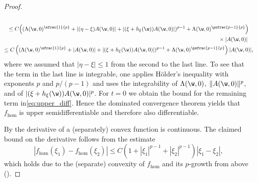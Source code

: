 \begin{proof}
\begin{multline*}
\\
\leq C \Bigl((\Lambda(\w,0)^{\sfrac{1}{p}}+|(\eta-\xi)A(\w,0)|+|(\xi+h_{\xi}(\w))A(\w,0)|)^{p-1}+\Lambda(\w,0)^{\psfrac{p-1}{p}}\Bigr)\\
\shoveright{{}\times|A(\w,0)|}
\\
\leq C \left((\Lambda(\w,0)^{\sfrac{1}{p}}+|A(\w,0)|+|(\xi+h_{\xi}(\w))A(\w,0)|)^{p-1}+\Lambda(\w,0)^{\psfrac{p-1}{p}}\right)|A(\w,0)|,
\end{multline*}
where we assumed that $|\eta-\xi|\leq 1$ from the second to the last line.
To see that the term in the last line is integrable, one applies Hölder's inequality with exponents $p$ and $p/(p-1)$ and uses the integrability of $\Lambda(\w,0)$, $\|A(\w,0)\|^p$, and of $|(\xi+h_{\xi}(\w))A(\w,0)|^p$. For $t=0$ we obtain the bound for the remaining term in\eqref{eq:upper_diff}. Hence the dominated convergence theorem yields that $f_{\hom}$ is upper semidifferentiable and therefore also differentiable.

By \cite[Th.\,4.65]{FoLe} the derivative of a (separately) convex function is continuous. The claimed bound on the derivative follows from the estimate
\begin{equation*}
|f_{\hom}(\xi_1)-f_{\hom}(\xi_2)|\leq C(1+|\xi_1|^{p-1}+|\xi_2|^{p-1})|\xi_1-\xi_2|,
\end{equation*}
which holds due to the (separate) convexity of $f_{\hom}$ and its $p$-growth from above (\cf \cite[Prop.\,4.64]{FoLe}).
\end{proof}

